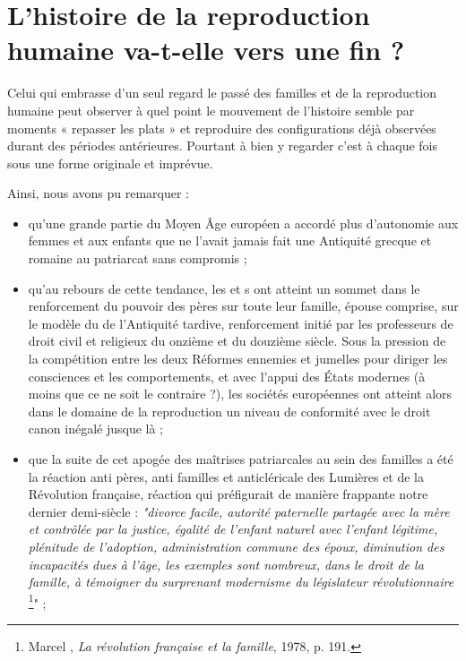    \section{L'histoire de la reproduction humaine va-t-elle vers une fin ?}
 
 Celui qui embrasse d'un seul regard le passé des familles et de la reproduction humaine peut observer à quel point le mouvement de l'histoire semble par moments « repasser les plats » et reproduire des configurations déjà observées durant des périodes antérieures. Pourtant à bien y regarder c'est à chaque fois sous une forme originale et imprévue.  
 
 Ainsi, nous avons pu remarquer : 
\begin{itemize}

\item qu'une grande partie du Moyen Âge européen a accordé plus d'autonomie aux femmes et aux enfants que ne l'avait jamais fait une Antiquité grecque et romaine au patriarcat sans compromis ;

\item qu'au rebours de cette tendance, les  et s ont atteint un sommet dans le renforcement du pouvoir des pères sur toute leur famille, épouse comprise, sur le modèle du  de l'Antiquité tardive, renforcement initié par les professeurs de droit civil et religieux du onzième et du douzième siècle. Sous la pression de la compétition entre les deux Réformes ennemies et jumelles pour diriger les consciences et les comportements, et avec l'appui des États modernes (à moins que ce ne soit le contraire ?), les sociétés européennes ont atteint alors dans le domaine de la reproduction un niveau de conformité avec le droit canon inégalé jusque là ;

\item que la suite de cet apogée des maîtrises patriarcales au sein des familles a été la réaction anti pères, anti familles et anticléricale des Lumières et de la Révolution française, réaction qui préfigurait de manière frappante notre dernier demi-siècle : \emph{"divorce facile, autorité paternelle partagée avec la mère et contrôlée par la justice, égalité de l'enfant naturel avec l'enfant légitime, plénitude de l'adoption, administration commune des époux, diminution des incapacités dues à l'âge, les exemples sont nombreux, dans le droit de la famille, à témoigner du surprenant modernisme du législateur révolutionnaire}
\footnote{Marcel , \emph{La révolution française et la famille}, 1978, p. 191.}" ;


\end{itemize}
